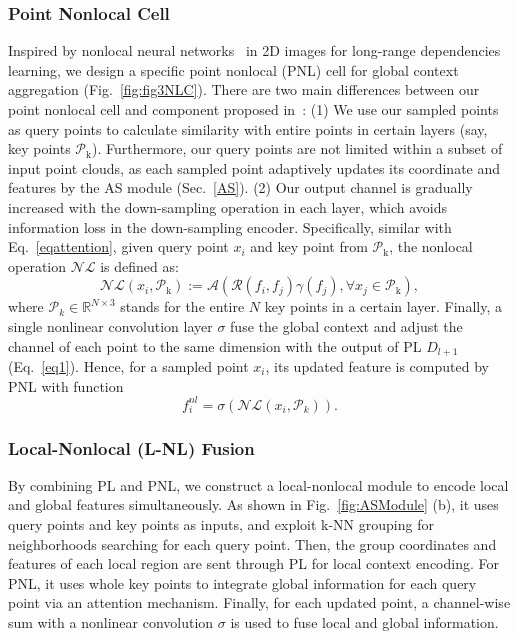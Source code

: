 \documentclass[10pt,twocolumn,letterpaper]{article}
\begin{document}
	\subsubsection{Point Nonlocal Cell} 
	Inspired by nonlocal neural networks~\cite{Nonlocal} in 2D images for long-range dependencies learning, we design a specific point nonlocal (PNL) cell for global context aggregation (Fig.~\ref{fig:fig3NLC}). There are two main differences between our point nonlocal cell and component proposed in~\cite{Nonlocal}: (1) We use our sampled points as query points to calculate similarity with entire points in certain layers (say, key points $\mathcal{P}_{\text{k}}$). Furthermore, our query points are not limited within a subset of input point clouds, as each sampled point adaptively updates its coordinate and features by the AS module (Sec.~\ref{AS}). (2) Our output channel is gradually increased with the down-sampling operation in each layer, which avoids information loss in the down-sampling encoder. Specifically, similar with Eq.~\ref{eqattention}, given query point $x_i$ and key point from $\mathcal{P}_{\text{k}}$, the nonlocal operation $\mathcal{NL}$ is defined as:
	\begin{equation}
	\mathcal{NL}(x_i, \mathcal{P}_{\text{k}}) :=  \mathcal{A}(\mathcal{R}(f_i ,f_j)\gamma(f_j), \forall x_j \in \mathcal{P}_{\text{k}}),
	\label{Nonlocal}
	\end{equation}
	where $\mathcal{P}_{k}\in \mathbb{R}^{N\times3}$ stands for the entire $N$ key points in a certain layer. Finally, a single nonlinear convolution layer  $\sigma$ fuse the global context and adjust the channel of each point to the same dimension with the output of PL $D_{l+1}$ (Eq.~\ref{eq1}). Hence, for a sampled point $x_i$,  its updated feature is computed by PNL with function
	\begin{equation}
	f_i^{nl} =  \sigma(\mathcal{NL}(x_i, \mathcal{P}_{k})).
	\end{equation}
	
	
	\subsubsection{Local-Nonlocal (L-NL) Fusion} 
	
	By combining PL and PNL, we construct a local-nonlocal module to encode local and global features simultaneously. As shown in Fig.~\ref{fig:ASModule} (b), it uses query points and key points as inputs, and exploit k-NN grouping for neighborhoods searching for each query point. Then, the group coordinates and features of each local region are sent through PL for local context encoding. For PNL, it uses whole key points  to integrate global information for each query point via an attention mechanism.  Finally, for each updated point, a channel-wise sum with a nonlinear convolution $\sigma$ is used to fuse local and global information.
	
\end{document}
